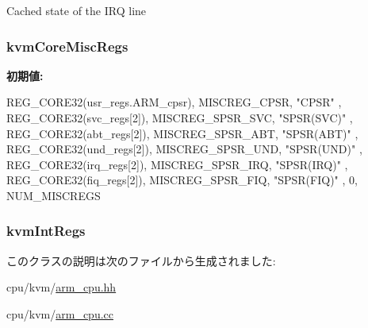 \label{classArmKvmCPU_af61d21c5b06aff9f758f797b2c8d422f}
Cached state of the IRQ line \hypertarget{classArmKvmCPU_a7f2a34be5f2a6e8b6812657f935461cf}{
\subsubsection[{kvmCoreMiscRegs}]{ {\bf kvmCoreMiscRegs}}}
\label{classArmKvmCPU_a7f2a34be5f2a6e8b6812657f935461cf}
{\bfseries 初期値:}
\begin{DoxyCode}
 {
    { REG_CORE32(usr_regs.ARM_cpsr), MISCREG_CPSR, "CPSR" },
    { REG_CORE32(svc_regs[2]), MISCREG_SPSR_SVC, "SPSR(SVC)" },
    { REG_CORE32(abt_regs[2]), MISCREG_SPSR_ABT, "SPSR(ABT)" },
    { REG_CORE32(und_regs[2]), MISCREG_SPSR_UND, "SPSR(UND)" },
    { REG_CORE32(irq_regs[2]), MISCREG_SPSR_IRQ, "SPSR(IRQ)" },
    { REG_CORE32(fiq_regs[2]), MISCREG_SPSR_FIQ, "SPSR(FIQ)" },
    { 0, NUM_MISCREGS }
}
\end{DoxyCode}
\hypertarget{classArmKvmCPU_a610b9b2e17374a59cb14ab6e1b7c3dd0}{
\subsubsection[{kvmIntRegs}]{ {\bf kvmIntRegs}}}
\label{classArmKvmCPU_a610b9b2e17374a59cb14ab6e1b7c3dd0}


このクラスの説明は次のファイルから生成されました:\begin{DoxyCompactItemize}
\item 
cpu/kvm/\hyperlink{arm__cpu_8hh}{arm\_\-cpu.hh}\item 
cpu/kvm/\hyperlink{arm__cpu_8cc}{arm\_\-cpu.cc}\end{DoxyCompactItemize}
